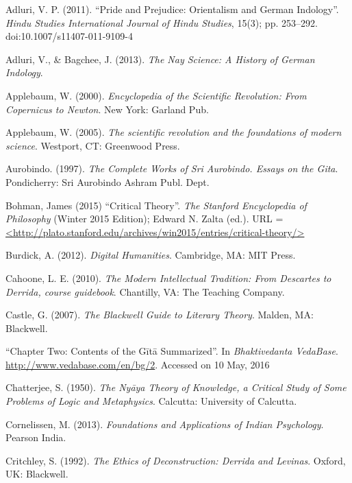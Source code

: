 \begin{thebibliography}{99}
\itemsep=2pt
Adluri, V. P. (2011). ``Pride and Prejudice: Orientalism and German Indology''. {\sl Hindu Studies International Journal of Hindu Studies}, 15(3); pp. 253--292. doi:10.1007/s11407-011-9109-4

Adluri, V., \& Bagchee, J. (2013). {\sl The Nay Science: A History of German Indology}. 

Applebaum, W. (2000). {\sl Encyclopedia of the Scientific Revolution: From Copernicus to Newton}. New York: Garland Pub.

Applebaum, W. (2005). {\sl The scientific revolution and the foundations of modern science}. Westport, CT: Greenwood Press.

Aurobindo. (1997). {\sl The Complete Works of Sri Aurobindo. Essays on the Gita}. Pondicherry: Sri Aurobindo Ashram Publ. Dept.

Bohman, James (2015) ``Critical Theory''. {\sl The Stanford Encyclopedia of Philosophy} (Winter 2015 Edition); Edward N. Zalta (ed.). URL = \url{<http://plato.stanford.edu/archives/win2015/entries/critical-theory/>}

Burdick, A. (2012). {\sl Digital Humanities}. Cambridge, MA: MIT Press.

Cahoone, L. E. (2010). {\sl The Modern Intellectual Tradition: From Descartes to Derrida, course guidebook}. Chantilly, VA: The Teaching Company.

Castle, G. (2007). {\sl The Blackwell Guide to Literary Theory}. Malden, MA: Blackwell.

``Chapter Two: Contents of the Gītā Summarized''. In {\sl Bhaktivedanta VedaBase}. \url{http://www.vedabase.com/en/bg/2}. Accessed on 10 May, 2016

Chatterjee, S. (1950). {\sl The Nyāya Theory of Knowledge, a Critical Study of Some Problems of Logic and Metaphysics}. Calcutta: University of Calcutta.

Cornelissen, M. (2013). {\sl Foundations and Applications of Indian Psychology}. Pearson India.

Critchley, S. (1992). {\sl The Ethics of Deconstruction: Derrida and Levinas}. Oxford, UK: Blackwell.


\end{thebibliography}
